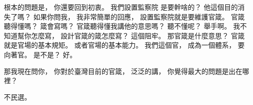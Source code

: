 \hypertarget{w01:cue:3058}{}根本的問題是，
\hypertarget{w01:cue:3059}{}你還要回到初衷。
\hypertarget{w01:cue:3060}{}我們設置監察院
\hypertarget{w01:cue:3061}{}是要幹啥的？
\hypertarget{w01:cue:3062}{}他這個目的消失了嗎？
\hypertarget{w01:cue:3063}{}如果你問我，
\hypertarget{w01:cue:3064}{}我非常簡單的回應，
\hypertarget{w01:cue:3065}{}設置監察院就是要維護官箴。
\hypertarget{w01:cue:3066}{}官箴聽得懂嗎？
\hypertarget{w01:cue:3067}{}箴會寫嗎？
\hypertarget{w01:cue:3068}{}官箴聽得懂我講他的意思嗎？
\hypertarget{w01:cue:3069}{}聽不懂呢？
\hypertarget{w01:cue:3070}{}舉手啊。
\hypertarget{w01:cue:3071}{}我不知道幫你怎麼寫，
\hypertarget{w01:cue:3072}{}設計官箴的箴怎麼寫？
\hypertarget{w01:cue:3073}{}這個阻牢。
\hypertarget{w01:cue:3074}{}那官箴是什麼意思？
\hypertarget{w01:cue:3075}{}官箴就是官場的基本規矩。
\hypertarget{w01:cue:3076}{}或者官場的基本能力。
\hypertarget{w01:cue:3077}{}我們這個官，
\hypertarget{w01:cue:3078}{}成為一個體系，
\hypertarget{w01:cue:3079}{}要向著官。
\hypertarget{w01:cue:3080}{}是不是？
\hypertarget{w01:cue:3081}{}好。

\hypertarget{w01:cue:3082}{}那我現在問你，
\hypertarget{w01:cue:3083}{}你對於臺灣目前的官箴，
\hypertarget{w01:cue:3084}{}泛泛的講，
\hypertarget{w01:cue:3085}{}你覺得最大的問題是出在哪裡？

\hypertarget{w01:cue:3086}{}不民選。

